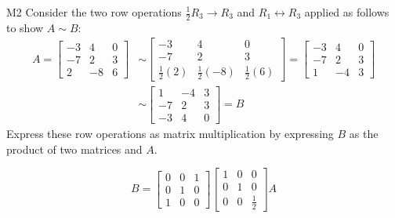 \begin{problem}{M2}
Consider the two row operations 
\(\frac{1}{2} R_3\to R_3\) and \(R_1\leftrightarrow R_3\)
applied as follows to show \(A\sim B\):
\begin{align*}
A
  =
\begin{bmatrix}
-3&4&0\\
-7&2&3\\
2&-8&6
\end{bmatrix}
  &\sim
\begin{bmatrix}
-3&4&0\\
-7&2&3\\
\frac{1}{2}(2)&\frac{1}{2}(-8)&\frac{1}{2}(6)
\end{bmatrix}
  =
\begin{bmatrix}
-3&4&0\\
-7&2&3\\
1&-4&3
\end{bmatrix}
  \\&\sim
\begin{bmatrix}
1&-4&3\\
-7&2&3\\
-3&4&0
\end{bmatrix}
  =
B
\end{align*}
Express these row operations as matrix multiplication
by expressing \(B\) as the product of two matrices and \(A\).
\end{problem}
\begin{solution}
\[
B
  =
\begin{bmatrix}
  0&0&1\\
  0&1&0\\
  1&0&0
\end{bmatrix}
\begin{bmatrix}
  1&0&0\\
  0&1&0\\
  0&0&\frac{1}{2}
\end{bmatrix}
A
\]
\end{solution}

